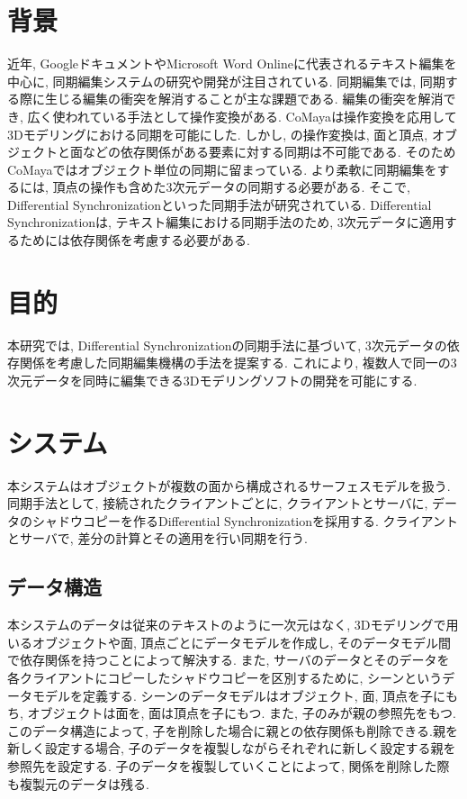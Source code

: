\documentclass{AIabst}
\begin{document}
\makeAbstHeader
%
%
%
\section{背景}
	近年, GoogleドキュメントやMicrosoft Word Onlineに代表されるテキスト編集を中心に, 同期編集システムの研究や開発が注目されている.
	同期編集では, 同期する際に生じる編集の衝突を解消することが主な課題である.
	編集の衝突を解消でき, 広く使われている手法として操作変換がある.
	CoMaya\cite{COMAYA}は操作変換を応用して3Dモデリングにおける同期を可能にした.
	しかし, \cite{COMAYA}の操作変換は, 面と頂点, オブジェクトと面などの依存関係がある要素に対する同期は不可能である.
	そのためCoMayaではオブジェクト単位の同期に留まっている.
	より柔軟に同期編集をするには, 頂点の操作も含めた3次元データの同期する必要がある.
	そこで, Differential Synchronization\cite{DS}といった同期手法が研究されている.
	Differential Synchronizationは, テキスト編集における同期手法のため, 3次元データに適用するためには依存関係を考慮する必要がある.
\section{目的}
 本研究では, Differential Synchronizationの同期手法に基づいて, 3次元データの依存関係を考慮した同期編集機構の手法を提案する.
  これにより, 複数人で同一の3次元データを同時に編集できる3Dモデリングソフトの開発を可能にする.
\section{システム}
 本システムはオブジェクトが複数の面から構成されるサーフェスモデルを扱う. 同期手法として, 接続されたクライアントごとに, クライアントとサーバに, データのシャドウコピーを作るDifferential Synchronizationを採用する. クライアントとサーバで, 差分の計算とその適用を行い同期を行う.
  \subsection{データ構造}
	本システムのデータは従来のテキストのように一次元はなく, 3Dモデリングで用いるオブジェクトや面, 頂点ごとにデータモデルを作成し, そのデータモデル間で依存関係を持つことによって解決する.
  また, サーバのデータとそのデータを各クライアントにコピーしたシャドウコピーを区別するために, シーンというデータモデルを定義する.
  シーンのデータモデルはオブジェクト, 面, 頂点を子にもち, オブジェクトは面を, 面は頂点を子にもつ. また, 子のみが親の参照先をもつ.
   このデータ構造によって, 子を削除した場合に親との依存関係も削除できる.親を新しく設定する場合, 子のデータを複製しながらそれぞれに新しく設定する親を参照先を設定する.
   子のデータを複製していくことによって, 関係を削除した際も複製元のデータは残る.
\end{document}
